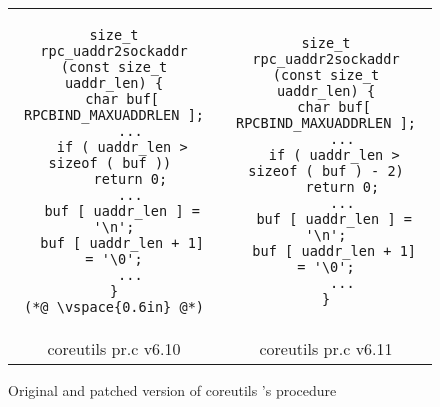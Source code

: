 \begin{figure*}
\centering
\begin{tabular}{cc}
\begin{lstlisting}
size_t rpc_uaddr2sockaddr (const size_t uaddr_len) {
  char buf[ RPCBIND_MAXUADDRLEN ];
    ...
  if ( uaddr_len > sizeof ( buf )) 
    return 0;
    ...
  buf [ uaddr_len ] = '\n';
  buf [ uaddr_len + 1] = '\0';
    ...
}
(*@ \vspace{0.6in} @*)
\end{lstlisting}
\hspace{1.0in}
&
\begin{lstlisting}
size_t rpc_uaddr2sockaddr (const size_t uaddr_len) {
  char buf[ RPCBIND_MAXUADDRLEN ];
    ...
  if ( uaddr_len > sizeof ( buf ) - 2)
    return 0;
    ...
  buf [ uaddr_len ] = '\n';
  buf [ uaddr_len + 1] = '\0';
    ...
}
\end{lstlisting}
\\
coreutils pr.c v6.10 & coreutils pr.c v6.11
\end{tabular}
\caption{Original and patched version of coreutils 's  procedure}
\end{figure*}

